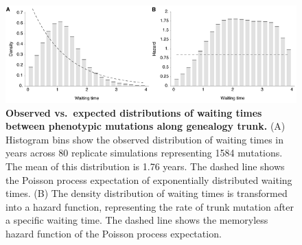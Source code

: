 \pagebreak

\begin{figure}[!c]
	\centering
	\includegraphics{figures/waittimes}
	\caption{\textbf{Observed vs.\ expected distributions of waiting times between phenotypic mutations along genealogy trunk.} (A) Histogram bins show the observed distribution of waiting times in years across 80 replicate simulations representing 1584 mutations.  The mean of this distribution is 1.76 years.  The dashed line shows the Poisson process expectation of exponentially distributed waiting times.  (B) The density distribution of waiting times is transformed into a hazard function, representing the rate of trunk mutation after a specific waiting time.  The dashed line shows the memoryless hazard function of the Poisson process expectation.}
	\label{waittimes}
\end{figure}

\pagebreak

